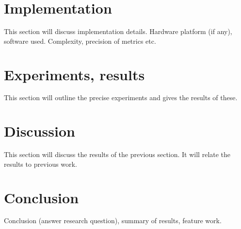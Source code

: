 \documentclass[a4paper,10pt]{extarticle}
\begin{document}
\section{Implementation}
This section will discuss implementation details. Hardware platform (if any), software used. Complexity, precision of metrics etc.

\section{Experiments, results}
This section will outline the precise experiments and gives the results of these.

\section{Discussion}
This section will discuss the results of the previous section. It will relate the results to previous work.

\section{Conclusion}
Conclusion (answer research question), summary of results, feature work.
\end{document}
